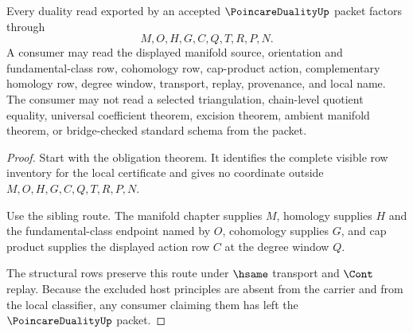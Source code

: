 \begin{theorem}
\label{thm:poincare-duality-scope-boundary}
Every duality read exported by an accepted $\PoincareDualityUp$ packet factors through
$$
M,O,H,G,C,Q,T,R,P,N .
$$
A consumer may read the displayed manifold source, orientation and fundamental-class row, cohomology row, cap-product action, complementary homology row, degree window, transport, replay, provenance, and local name. The consumer may not read a selected triangulation, chain-level quotient equality, universal coefficient theorem, excision theorem, ambient manifold theorem, or bridge-checked standard schema from the packet.
\end{theorem}
\begin{proof}
Start with the obligation theorem. It identifies the complete visible row inventory for the local certificate and gives no coordinate outside $M,O,H,G,C,Q,T,R,P,N$.

Use the sibling route. The manifold chapter supplies $M$, homology supplies $H$ and the fundamental-class endpoint named by $O$, cohomology supplies $G$, and cap product supplies the displayed action row $C$ at the degree window $Q$.

The structural rows preserve this route under $\hsame$ transport and $\Cont$ replay. Because the excluded host principles are absent from the carrier and from the local classifier, any consumer claiming them has left the $\PoincareDualityUp$ packet.
\end{proof}





